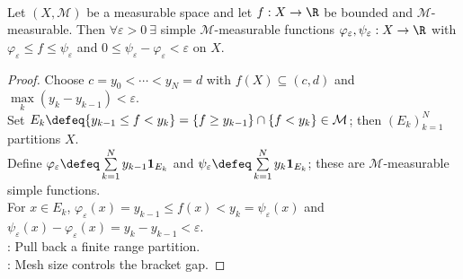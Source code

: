 \begin{lemma} \label{lem:bounded-simple-approximation-brackets} \\
Let $(X,\mathcal{M})$ be a measurable space and let $f:X\to\R$ be bounded and $\mathcal{M}$-measurable. Then $\forall\varepsilon>0\ \exists$ simple $\mathcal{M}$-measurable functions $\varphi_\varepsilon,\psi_\varepsilon:X\to\R$ with $\varphi_\varepsilon\leq f\leq\psi_\varepsilon$ and $0\leq\psi_\varepsilon-\varphi_\varepsilon<\varepsilon$ on $X$.
\begin{proof} Choose $c=y_0<\cdots<y_N=d$ with $f(X)\subseteq(c,d)$ and $\max\limits_k(y_k-y_{k-1})<\varepsilon$.\\
Set $E_k\defeq\{y_{k-1}\leq f<y_k\}=\{f\geq y_{k-1}\}\cap\{f<y_k\}\in\mathcal{M}$; then $(E_k)_{k=1}^{N}$ partitions $X$.\\
Define $\varphi_\varepsilon\defeq\sum\limits_{k=1}^{N}y_{k-1}\mathbf{1}_{E_k}$ and $\psi_\varepsilon\defeq\sum\limits_{k=1}^{N}y_k\mathbf{1}_{E_k}$; these are $\mathcal{M}$-measurable simple functions.\\
For $x\in E_k$, $\varphi_\varepsilon(x)=y_{k-1}\leq f(x)<y_k=\psi_\varepsilon(x)$ and $\psi_\varepsilon(x)-\varphi_\varepsilon(x)=y_k-y_{k-1}<\varepsilon$.\\
: Pull back a finite range partition.\\
: Mesh size controls the bracket gap.
\end{proof}
\end{lemma}

